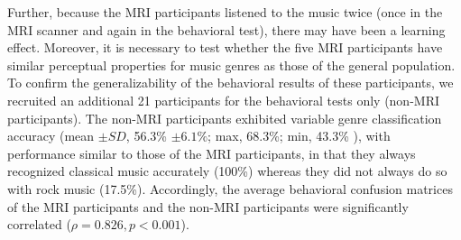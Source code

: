 \documentclass[final,3p,times,twocolumn]{elsarticle}
\begin{document}
Further, because the MRI participants listened to the music twice (once in the MRI scanner and again in the behavioral test), there may have been a learning effect.
Moreover, it is necessary to test whether the five MRI participants have similar perceptual properties for music genres as those of the general population.
To confirm the generalizability of the behavioral results of these participants, we recruited an additional 21 participants for the behavioral tests only (non-MRI participants).
The non-MRI participants exhibited variable genre classification accuracy (mean $\pm SD $, 56.3\% $ \pm 6.1\% $; max, 68.3\%; min, 43.3\% ), with performance similar to those of the MRI participants, in that they always recognized classical music accurately (100\%) whereas they did not always do so with rock music (17.5\%). 
Accordingly, the average behavioral confusion matrices of the MRI participants and the non-MRI participants were significantly correlated ($ \rho = 0.826, p < 0.001 $).






\end{document}
